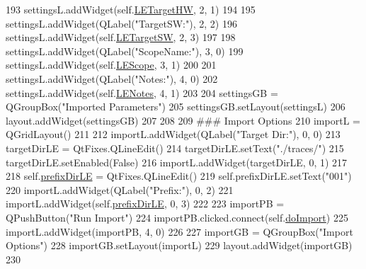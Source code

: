 \begin{DoxyCode}
193         settingsL.addWidget(self.\hyperlink{classsoftware_1_1chipwhisperer_1_1common_1_1traces_1_1TraceContainerDPAv3_1_1ImportDPAv3Dialog_aa18f50cd04f9119d116c56753147d33b}{LETargetHW}, 2, 1)
194 
195         settingsL.addWidget(QLabel(\textcolor{stringliteral}{"TargetSW:"}), 2, 2)
196         settingsL.addWidget(self.\hyperlink{classsoftware_1_1chipwhisperer_1_1common_1_1traces_1_1TraceContainerDPAv3_1_1ImportDPAv3Dialog_a07c0ca40a1e232c52bda9775c0cc02f6}{LETargetSW}, 2, 3)
197 
198         settingsL.addWidget(QLabel(\textcolor{stringliteral}{"ScopeName:"}), 3, 0)
199         settingsL.addWidget(self.\hyperlink{classsoftware_1_1chipwhisperer_1_1common_1_1traces_1_1TraceContainerDPAv3_1_1ImportDPAv3Dialog_aaed8b45895879c0ec9180544072352e8}{LEScope}, 3, 1)
200 
201         settingsL.addWidget(QLabel(\textcolor{stringliteral}{"Notes:"}), 4, 0)
202         settingsL.addWidget(self.\hyperlink{classsoftware_1_1chipwhisperer_1_1common_1_1traces_1_1TraceContainerDPAv3_1_1ImportDPAv3Dialog_a4150ecb693edb8a61987d6fca245a042}{LENotes}, 4, 1)
203 
204         settingsGB = QGroupBox(\textcolor{stringliteral}{"Imported Parameters"})
205         settingsGB.setLayout(settingsL)
206         layout.addWidget(settingsGB)
207 
208 
209         \textcolor{comment}{### Import Options}
210         importL = QGridLayout()
211 
212         importL.addWidget(QLabel(\textcolor{stringliteral}{"Target Dir:"}), 0, 0)
213         targetDirLE = QtFixes.QLineEdit()
214         targetDirLE.setText(\textcolor{stringliteral}{"./traces/"})
215         targetDirLE.setEnabled(\textcolor{keyword}{False})
216         importL.addWidget(targetDirLE, 0, 1)
217 
218         self.\hyperlink{classsoftware_1_1chipwhisperer_1_1common_1_1traces_1_1TraceContainerDPAv3_1_1ImportDPAv3Dialog_a2e51a145f598b93a272f81c1ceedd847}{prefixDirLE} = QtFixes.QLineEdit()
219         self.prefixDirLE.setText(\textcolor{stringliteral}{"001"})
220         importL.addWidget(QLabel(\textcolor{stringliteral}{"Prefix:"}), 0, 2)
221         importL.addWidget(self.\hyperlink{classsoftware_1_1chipwhisperer_1_1common_1_1traces_1_1TraceContainerDPAv3_1_1ImportDPAv3Dialog_a2e51a145f598b93a272f81c1ceedd847}{prefixDirLE}, 0, 3)
222         
223         importPB = QPushButton(\textcolor{stringliteral}{"Run Import"})
224         importPB.clicked.connect(self.\hyperlink{classsoftware_1_1chipwhisperer_1_1common_1_1traces_1_1TraceContainerDPAv3_1_1ImportDPAv3Dialog_a27dcda3d2c45c033757cea03b9f67cda}{doImport})
225         importL.addWidget(importPB, 4, 0)
226 
227         importGB = QGroupBox(\textcolor{stringliteral}{"Import Options"})
228         importGB.setLayout(importL)
229         layout.addWidget(importGB)
230 
\end{DoxyCode}


